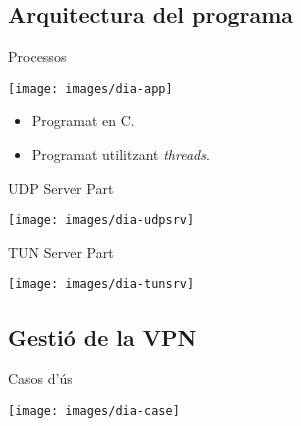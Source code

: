 \subsection{Arquitectura del programa}
    \begin{frame}{Processos}
        \begin{center}
        \texttt{[image: images/dia-app]}
        \end{center}
		\begin{itemize}
\item Programat en C.
\item Programat utilitzant \emph{threads}.
		\end{itemize}
    \end{frame}
    \begin{frame}{UDP Server Part}
        \begin{center}
        \texttt{[image: images/dia-udpsrv]}
        \end{center}
    \end{frame}
    \begin{frame}{TUN Server Part}
        \begin{center}
        \texttt{[image: images/dia-tunsrv]}
        \end{center}
    \end{frame}
\subsection{Gestió de la VPN}
    \begin{frame}{Casos d'ús}
        \begin{center}
        \texttt{[image: images/dia-case]}
        \end{center}
    \end{frame}
